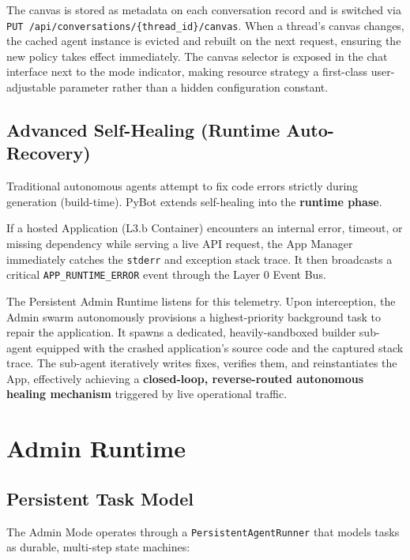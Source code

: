 \documentclass[11pt,a4paper]{article}
\begin{document}
The canvas is stored as metadata on each conversation record and is switched via \texttt{PUT /api/conversations/\{thread\_id\}/canvas}.
When a thread's canvas changes, the cached agent instance is evicted and rebuilt on the next request, ensuring the new policy takes effect immediately.
The canvas selector is exposed in the chat interface next to the mode indicator, making resource strategy a first-class user-adjustable parameter rather than a hidden configuration constant.

\subsection{Advanced Self-Healing (Runtime Auto-Recovery)}

Traditional autonomous agents attempt to fix code errors strictly during generation (build-time). PyBot extends self-healing into the \textbf{runtime phase}. 

If a hosted Application (L3.b Container) encounters an internal error, timeout, or missing dependency while serving a live API request, the App Manager immediately catches the \texttt{stderr} and exception stack trace. It then broadcasts a critical \texttt{APP\_RUNTIME\_ERROR} event through the Layer 0 Event Bus.

The Persistent Admin Runtime listens for this telemetry. Upon interception, the Admin swarm autonomously provisions a highest-priority background task to repair the application. It spawns a dedicated, heavily-sandboxed builder sub-agent equipped with the crashed application's source code and the captured stack trace. The sub-agent iteratively writes fixes, verifies them, and reinstantiates the App, effectively achieving a \textbf{closed-loop, reverse-routed autonomous healing mechanism} triggered by live operational traffic.

\section{Admin Runtime}
\label{sec:runtime}

\subsection{Persistent Task Model}

The Admin Mode operates through a \texttt{PersistentAgentRunner} that models tasks as durable, multi-step state machines:
\end{document}
